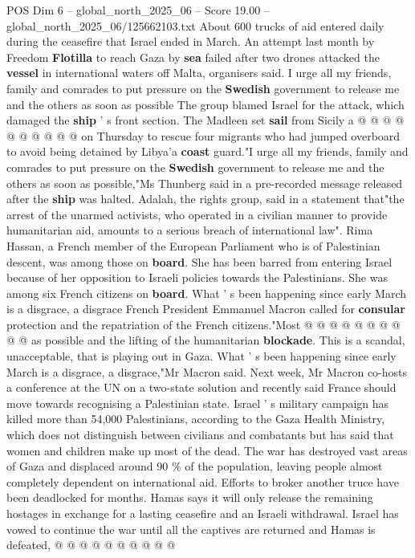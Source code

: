 \begin{textsample}{POS Dim 6 – global\_north\_2025\_06 – Score 19.00 – global\_north\_2025\_06/125662103.txt}
About 600 trucks of aid entered daily during the ceasefire that Israel ended in March.
An attempt last month by Freedom \textbf{Flotilla} to reach Gaza by \textbf{sea} failed after two drones attacked the \textbf{vessel} in international waters off Malta, organisers said.
I urge all my friends, family and comrades to put pressure on the \textbf{Swedish} government to release me and the others as soon as possible The group blamed Israel for the attack, which damaged the \textbf{ship} ' s front section.
The Madleen set \textbf{sail} from Sicily a @ @ @ @ @ @ @ @ @ @ on Thursday to rescue four migrants who had jumped overboard to avoid being detained by Libya'a \textbf{coast} guard."I urge all my friends, family and comrades to put pressure on the \textbf{Swedish} government to release me and the others as soon as possible,"Ms Thunberg said in a pre-recorded message released after the \textbf{ship} was halted.
Adalah, the rights group, said in a statement that"the arrest of the unarmed activists, who operated in a civilian manner to provide humanitarian aid, amounts to a serious breach of international law".
Rima Hassan, a French member of the European Parliament who is of Palestinian descent, was among those on \textbf{board}.
She has been barred from entering Israel because of her opposition to Israeli policies towards the Palestinians.
She was among six French citizens on \textbf{board}.
What ' s been happening since early March is a disgrace, a disgrace French President Emmanuel Macron called for \textbf{consular} protection and the repatriation of the French citizens."Most @ @ @ @ @ @ @ @ @ @ as possible and the lifting of the humanitarian \textbf{blockade}.
This is a scandal, unacceptable, that is playing out in Gaza.
What ' s been happening since early March is a disgrace, a disgrace,"Mr Macron said.
Next week, Mr Macron co-hosts a conference at the UN on a two-state solution and recently said France should move towards recognising a Palestinian state.
Israel ' s military campaign has killed more than 54,000 Palestinians, according to the Gaza Health Ministry, which does not distinguish between civilians and combatants but has said that women and children make up most of the dead.
The war has destroyed vast areas of Gaza and displaced around 90 \% of the population, leaving people almost completely dependent on international aid.
Efforts to broker another truce have been deadlocked for months.
Hamas says it will only release the remaining hostages in exchange for a lasting ceasefire and an Israeli withdrawal.
Israel has vowed to continue the war until all the captives are returned and Hamas is defeated, @ @ @ @ @ @ @ @ @ @

\end{textsample}
